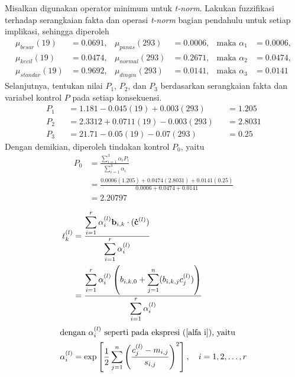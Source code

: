 \begin{contoh}
\noindent Misalkan digunakan operator minimum untuk \emph{t-norm}. Lakukan fuzzifikasi terhadap serangkaian fakta dan operasi \emph{t-norm} bagian pendahulu untuk setiap implikasi, sehingga diperoleh
\begin{align*}
    \mu_{besar}(19) &= \num{0,0691}, & \mu_{panas}(293) &= \num{0,0006}, &\text{maka } \alpha_1&= \num{0,0006},\\
    \mu_{kecil}(19) &= \num{0,0474}, & \mu_{normal}(293) &= \num{0,2671},&\text{maka } \alpha_2&= \num{0,0474},\\
    \mu_{standar}(19) &= \num{0,9692}, & \mu_{dingin}(293)&= \num{0,0141},&\text{maka } \alpha_3&= \num{0,0141}
\end{align*}
Selanjutnya, tentukan nilai $P_1$, $P_2$, dan $P_3$ berdasarkan serangkaian fakta dan variabel kontrol $P$ pada setiap konsekuensi.
\begin{align*}
    P_1 &&= \num{1,181} - \num{0,045}(19) + \num{0,003}(293) &&= \num{1,205}\\
    P_2 &&= \num{2,3312} + \num{0,0711}(19) - \num{0,003}(293) &&= \num{2,8031}\\
    P_3 &&= \num{21,71} - \num{0,05}(19)  - \num{0,07}(293) &&= \num{0,25}
\end{align*}
Dengan demikian, diperoleh tindakan kontrol $P_0$, yaitu
\begin{align*}
    P_0 &= \displaystyle \frac{\displaystyle\sum_{i=1}^3 \alpha_i P_i}{\displaystyle\sum_{i=1}^3 \alpha_i}\\
    &= \displaystyle \frac{\num{0,0006}(\num{1,205})+\num{0,0474}(\num{2,8031}) + \num{0,0141}(\num{0,25})}{\num{0,0006}+\num{0,0474} + \num{0,0141}} \\
    &= \num{2,20797}
\end{align*}
\end{contoh}

\begin{align}
    t^{(l)}_k &= \displaystyle \frac{\displaystyle \sum_{i=1}^r \alpha^{(l)}_i \mathbf{b}_{i,k}\cdot(\mathbf{\Dot{c}}^{(l)}) }{\displaystyle \sum_{i=1}^r \alpha^{(l)}_i } \nonumber \\
    \label{nilai t_lk}
    &= \displaystyle \frac{\displaystyle \sum_{i=1}^r \alpha^{(l)}_i \left( b_{i,k,0} + \displaystyle \sum_{j=1}^n (b_{i,k,j}c^{(l)}_j) \right) }{\displaystyle \sum_{i=1}^r \alpha^{(l)}_i }\\
    \intertext{dengan $\alpha^{(l)}_i$ seperti pada ekspresi (\ref{alfa i}), yaitu}
    \label{alfa l i}
    \alpha^{(l)}_i &= \displaystyle \exp \left[ \displaystyle \frac{1}{2} \displaystyle\sum_{j=1}^n \left( \displaystyle \frac{c^{(l)}_j-m_{i,j}}{s_{i,j}} \right)^2 \right],
    \quad i=1,2,\ldots,r
\end{align}

